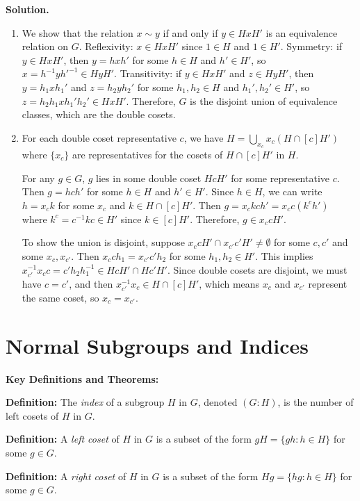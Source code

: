 \noindent\textbf{Solution.}
\begin{enumerate}[label=(\alph*)]
\item We show that the relation $x \sim y$ if and only if $y \in HxH'$ is an equivalence relation on $G$. Reflexivity: $x \in HxH'$ since $1 \in H$ and $1 \in H'$. Symmetry: if $y \in HxH'$, then $y = hxh'$ for some $h \in H$ and $h' \in H'$, so $x = h^{-1}yh'^{-1} \in HyH'$. Transitivity: if $y \in HxH'$ and $z \in HyH'$, then $y = h_1xh_1'$ and $z = h_2yh_2'$ for some $h_1, h_2 \in H$ and $h_1', h_2' \in H'$, so $z = h_2h_1xh_1'h_2' \in HxH'$. Therefore, $G$ is the disjoint union of equivalence classes, which are the double cosets.

\item For each double coset representative $c$, we have $H = \bigcup_{x_c} x_c(H \cap [c]H')$ where $\{x_c\}$ are representatives for the cosets of $H \cap [c]H'$ in $H$. 

For any $g \in G$, $g$ lies in some double coset $HcH'$ for some representative $c$. Then $g = hch'$ for some $h \in H$ and $h' \in H'$. Since $h \in H$, we can write $h = x_c k$ for some $x_c$ and $k \in H \cap [c]H'$. Then $g = x_c kch' = x_c c(k^c h')$ where $k^c = c^{-1}kc \in H'$ since $k \in [c]H'$. Therefore, $g \in x_c cH'$.

To show the union is disjoint, suppose $x_c cH' \cap x_{c'} c'H' \neq \emptyset$ for some $c, c'$ and some $x_c, x_{c'}$. Then $x_c ch_1 = x_{c'} c'h_2$ for some $h_1, h_2 \in H'$. This implies $x_{c'}^{-1}x_c c = c'h_2h_1^{-1} \in HcH' \cap Hc'H'$. Since double cosets are disjoint, we must have $c = c'$, and then $x_{c'}^{-1}x_c \in H \cap [c]H'$, which means $x_c$ and $x_{c'}$ represent the same coset, so $x_c = x_{c'}$.
\end{enumerate}

\section{Normal Subgroups and Indices}

\textbf{Key Definitions and Theorems:}

\textbf{Definition:} The \textit{index} of a subgroup $H$ in $G$, denoted $(G : H)$, is the number of left cosets of $H$ in $G$.

\textbf{Definition:} A \textit{left coset} of $H$ in $G$ is a subset of the form $gH = \{gh : h \in H\}$ for some $g \in G$.

\textbf{Definition:} A \textit{right coset} of $H$ in $G$ is a subset of the form $Hg = \{hg : h \in H\}$ for some $g \in G$.

